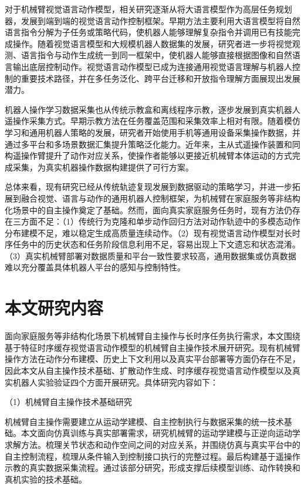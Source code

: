 对于机械臂视觉语言动作模型，相关研究逐渐从将大语言模型作为高层任务规划器，发展到端到端的视觉语言动作控制框架。早期方法主要利用大语言模型将自然语言指令分解为子任务或策略代码，使机器人能够理解复杂指令并调用已有技能完成操作。随着视觉语言模型和大规模机器人数据集的发展，研究者进一步将视觉观测、语言指令与动作生成统一到同一框架中，使机器人能够直接根据图像和自然语言输出底层控制动作。视觉语言动作模型已成为连接通用视觉语言理解与机器人控制的重要技术路径，并在多任务泛化、跨平台迁移和开放指令理解方面展现出发展潜力。

机器人操作学习数据采集也从传统示教盒和离线程序示教，逐步发展到真实机器人遥操作采集方式。早期示教方法在任务覆盖范围和采集效率上相对有限。随着模仿学习和通用机器人策略的发展，研究者开始使用手机等通用设备采集操作数据，并通过多平台和多场景数据汇集提升策略泛化能力。近年来，主从式遥操作装置和同构遥操作臂提升了动作对应关系，使操作者能够以更接近机械臂本体运动的方式完成采集，为真实机器操作数据构建提供了可行方案。

总体来看，现有研究已经从传统轨迹复现发展到数据驱动的策略学习，并进一步拓展到融合视觉、语言与动作的通用机器人控制框架，为机械臂在家庭服务等非结构化场景中的自主操作奠定了基础。然而，面向真实家庭服务任务时，现有方法仍存在三方面不足：（1）传统行为克隆和单步动作回归方法对动作轨迹中的多模态动作分布建模不足，难以稳定生成高质量连续动作。（2）现有视觉语言动作模型对长时序任务中的历史状态和任务阶段信息利用不足，容易出现上下文遗忘和状态混淆。（3）真实机械臂部署对数据质量和平台一致性要求较高，通用数据集或仿真数据难以充分覆盖具体机器人平台的感知与控制特性。

\section{本文研究内容}
\label{sec:research_content}

面向家庭服务等非结构化场景下机械臂自主操作与长时序任务执行需求，本文围绕基于特征时序缓存视觉语言动作模型的机械臂自主操作技术展开研究。现有机械臂操作方法在动作分布建模、历史上下文利用以及真实平台部署等方面仍存在不足，因此本文从自主操作技术基础、扩散动作生成、时序缓存视觉语言动作模型以及真实机器人实验验证四个方面开展研究。具体研究内容如下：

（1）机械臂自主操作技术基础研究

机械臂自主操作需要建立从运动学建模、自主控制执行与数据采集的统一技术基础。本文面向仿真训练与真实部署需求，研究机械臂的运动学建模与正逆向运动学求解方法。梳理关节状态和动作空间之间的对应关系，并围绕仿真与真实平台中的自主控制流程，梳理从条件输入到控制接口执行的完整过程。最后构建基于遥操作示教的真实数据采集流程。通过该部分研究，形成支撑后续模型训练、动作转换和真机实验的技术基础。


